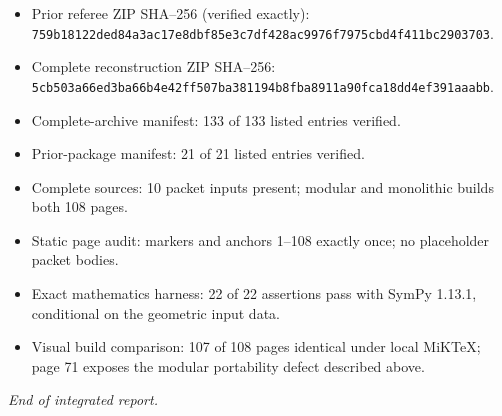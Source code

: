 \documentclass[11pt]{article}
\begin{document}
\begin{itemize}
\item Prior referee ZIP SHA--256 (verified exactly):\\[-0.2em]
\texttt{759b18122ded84a3ac17e8dbf85e3c7df428ac9976f7975cbd4f411bc2903703}.
\item Complete reconstruction ZIP SHA--256:\\[-0.2em]
\texttt{5cb503a66ed3ba66b4e42ff507ba381194b8fba8911a90fca18dd4ef391aaabb}.
\item Complete-archive manifest: 133 of 133 listed entries verified.
\item Prior-package manifest: 21 of 21 listed entries verified.
\item Complete sources: 10 packet inputs present; modular and monolithic builds both 108 pages.
\item Static page audit: markers and anchors 1--108 exactly once; no placeholder packet bodies.
\item Exact mathematics harness: 22 of 22 assertions pass with SymPy 1.13.1, conditional on the geometric input data.
\item Visual build comparison: 107 of 108 pages identical under local MiK\TeX{}; page 71 exposes the modular portability defect described above.
\end{itemize}

\vfill
\begin{center}
\small\itshape End of integrated report.
\end{center}
\end{document}
